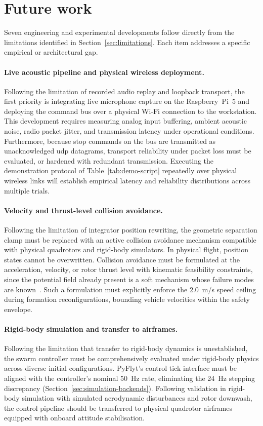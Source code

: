 \section{Future work}
\label{sec:future-work}
Seven engineering and experimental developments follow directly from the limitations identified in
Section~\ref{sec:limitations}. Each item addresses a specific empirical or architectural gap.

\paragraph{Live acoustic pipeline and physical wireless deployment.} Following the limitation of
recorded audio replay and loopback transport, the first priority is integrating live microphone capture
on the Raspberry~Pi~5 and deploying the command bus over a physical Wi-Fi connection to the workstation.
This development requires measuring analog input buffering, ambient acoustic noise, radio packet
jitter, and transmission latency under operational conditions. Furthermore, because stop commands on the
bus are transmitted as unacknowledged \gls{udp} datagrams, transport reliability under packet loss must
be evaluated, or hardened with redundant transmission. Executing the demonstration protocol of
Table~\ref{tab:demo-script} repeatedly over physical wireless links will establish empirical latency and
reliability distributions across multiple trials.

\paragraph{Velocity and thrust-level collision avoidance.} Following the limitation of integrator
position rewriting, the geometric separation clamp must be replaced with an active collision avoidance
mechanism compatible with physical quadrotors and rigid-body simulators. In physical flight, position
states cannot be overwritten. Collision avoidance must be formulated at the acceleration, velocity, or
rotor thrust level with kinematic feasibility constraints, since the potential field already
present is a soft mechanism whose failure modes are known~\cite{koren1991}. Such a formulation must
explicitly enforce the 2.0~m/s speed ceiling during formation reconfigurations, bounding vehicle
velocities within the safety envelope.

\paragraph{Rigid-body simulation and transfer to airframes.} Following the limitation that transfer to
rigid-body dynamics is unestablished, the swarm controller must be comprehensively evaluated under
rigid-body physics across diverse initial configurations. PyFlyt's control tick interface must be
aligned with the controller's nominal 50~Hz rate, eliminating the 24~Hz stepping discrepancy
(Section~\ref{sec:simulation-backends}). Following validation in rigid-body simulation with simulated
aerodynamic disturbances and rotor downwash, the control pipeline should be transferred to physical
quadrotor airframes equipped with onboard attitude stabilisation.

